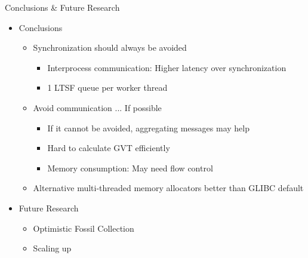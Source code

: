 \documentclass[10pt]{beamer}
\begin{document}
\begin{frame}{Conclusions \& Future Research}
    \begin{itemize}
        \item Conclusions
            \begin{itemize}
                \item Synchronization should always be avoided
                    \begin{itemize}
                        \item Interprocess communication: Higher latency over synchronization
                        \item 1 LTSF queue per worker thread
                    \end{itemize}
                \smallskip

                \item Avoid communication ... If possible
                    \begin{itemize}
                        \item If it cannot be avoided, aggregating messages may help
                        \item Hard to calculate GVT efficiently
                        \item Memory consumption: May need flow control
                    \end{itemize}
                \smallskip

                \item Alternative multi-threaded memory allocators better than GLIBC default
            \end{itemize}
        \bigskip

        \item Future Research
            \begin{itemize}
                \item Optimistic Fossil Collection
                \item Scaling up
            \end{itemize}
    \end{itemize}
\end{frame}
\end{document}

